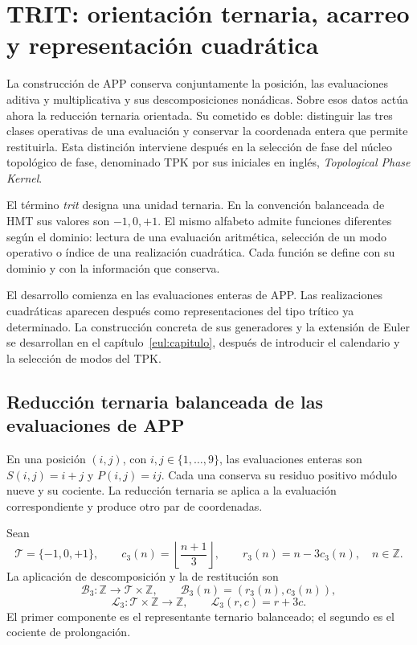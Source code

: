 \section{TRIT: orientación ternaria, acarreo y representación cuadrática}
\label{trit:capitulo}

La construcción de APP conserva conjuntamente la posición, las evaluaciones
aditiva y multiplicativa y sus descomposiciones nonádicas. Sobre esos datos
actúa ahora la reducción ternaria orientada. Su cometido es doble: distinguir
las tres clases operativas de una evaluación y conservar la coordenada entera
que permite restituirla. Esta distinción interviene después en la selección
de fase del núcleo topológico de fase, denominado TPK por sus iniciales en
inglés, \emph{Topological Phase Kernel}.

El término \emph{trit} designa una unidad ternaria. En la convención balanceada
de HMT sus valores son \(-1,0,+1\). El mismo alfabeto admite funciones
diferentes según el dominio: lectura de una evaluación aritmética, selección
de un modo operativo o índice de una realización cuadrática. Cada función
se define con su dominio y con la información que conserva.

El desarrollo comienza en las evaluaciones enteras de APP. Las realizaciones
cuadráticas aparecen después como representaciones del tipo trítico ya
determinado. La construcción concreta de sus generadores y la extensión de
Euler se desarrollan en el capítulo~\ref{eul:capitulo}, después de introducir
el calendario y la selección de modos del TPK.

\subsection{Reducción ternaria balanceada de las evaluaciones de APP}
\label{trit:reduccion}

En una posición \((i,j)\), con \(i,j\in\{1,\ldots,9\}\), las evaluaciones
enteras son \(S(i,j)=i+j\) y \(P(i,j)=ij\). Cada una conserva su residuo
positivo módulo nueve y su cociente. La reducción ternaria se aplica a la
evaluación correspondiente y produce otro par de coordenadas.

\begin{definicion}
\label{trit:def:balanceada}
Sean
\[
 \mathcal T=\{-1,0,+1\},\qquad
 c_3(n)=\left\lfloor\frac{n+1}{3}\right\rfloor,\qquad
 r_3(n)=n-3c_3(n),\quad n\in\mathbb Z.
\]
La aplicación de descomposición y la de restitución son
\[
 \mathcal B_3:\mathbb Z\longrightarrow\mathcal T\times\mathbb Z,
 \qquad \mathcal B_3(n)=(r_3(n),c_3(n)),
\]
\[
 \mathcal L_3:\mathcal T\times\mathbb Z\longrightarrow\mathbb Z,
 \qquad \mathcal L_3(r,c)=r+3c.
\]
El primer componente es el representante ternario balanceado; el segundo
es el cociente de prolongación.
\end{definicion}

